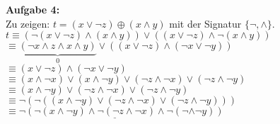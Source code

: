 \documentclass[a4paper]{scrartcl}
\begin{document}
	\begin{flushleft}
		\textbf{Aufgabe 4:}\\
		Zu zeigen: $t = (x\vee \neg z)\oplus (x \wedge y)$ mit der Signatur $\{\neg,\wedge\}$.\\ [1em]
		$t\equiv (\neg(x\vee \neg z)\wedge(x\wedge y))\vee((x\vee\neg z)\wedge\neg(x\wedge y))$\\
		$\equiv \underbrace{(\neg x\wedge z\wedge x\wedge y)}_{0}\vee((x\vee\neg z)\wedge(\neg x\vee\neg y))$\\
		$\equiv (x\vee \neg z)\wedge(\neg x\vee \neg y)$\\
		$\equiv (x\wedge \neg x)\vee(x\wedge \neg y)\vee(\neg z \wedge\neg x)\vee(\neg z\wedge \neg y)$\\
		$\equiv (x\wedge\neg y)\vee(\neg z\wedge\neg x)\vee(\neg z\wedge\neg y)$\\
		$\equiv \neg(\neg((x\wedge\neg y)\vee(\neg z\wedge \neg x)\vee(\neg z\wedge\neg y)))$\\
		$\underline{\equiv \neg(\neg(x\wedge\neg y)\wedge\neg(\neg z\wedge\neg x)\wedge\neg(\neg\wedge\neg y))}$\\
 	\end{flushleft}
\end{document}
